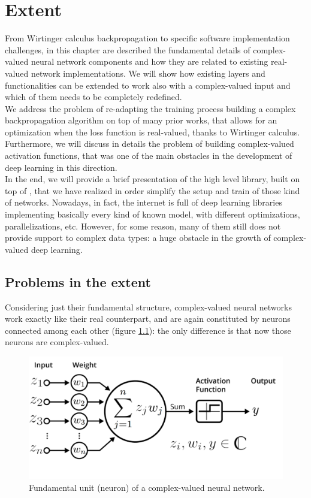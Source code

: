 \documentclass[../main.tex]{subfiles}
\begin{document}
	
\chapter{Extent}
From Wirtinger calculus backpropagation to specific software implementation challenges, in this chapter are described the fundamental details of
complex-valued neural network components and how they are related to existing real-valued network implementations. We will show how existing layers and functionalities can be extended to work also with a complex-valued input and which of them needs to be completely redefined.\\
We address the problem of re-adapting the training process building a complex backpropagation algorithm on top of many prior works, that allows for an optimization when the loss function is real-valued, thanks to Wirtinger calculus.\\
Furthermore, we will discuss in details the problem of building complex-valued activation functions, that was one of the main obstacles in the development of deep learning in this direction.\\
In the end, we will provide a brief presentation of the high level library, built on top of \JAX, that we have realized in order simplify the setup and train of those kind of networks. Nowadays, in fact, the internet is full of deep learning libraries implementing basically every kind of known model, with different optimizations, parallelizations, etc. However, for some reason, many of them still does not provide support to complex data types: a huge obstacle in the growth of complex-valued deep learning.


\section{Problems in the extent}
\label{sec:problems_extent}

Considering just their fundamental structure, complex-valued neural networks work exactly like their real counterpart, and are again constituted by neurons connected among each other (figure \ref{fig:cmplx_neuron}): the only difference is that now those neurons are complex-valued. 

\begin{figure}[!ht]
	\centering
	\includegraphics[scale=0.25]{pictures/complex_neuron}
	\caption{Fundamental unit (neuron) of a complex-valued neural network.}
	\label{fig:cmplx_neuron}
\end{figure}
\end{document}
